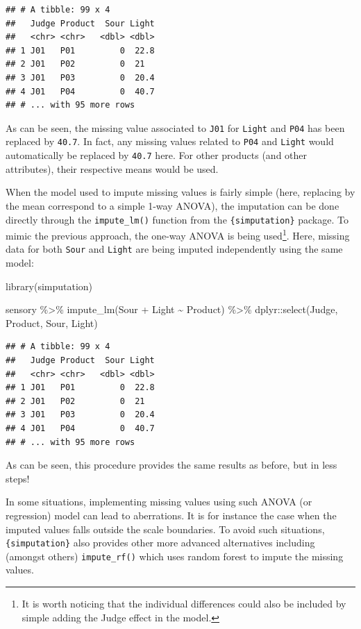 \documentclass[
]{krantz}
\makeatletter
\newenvironment{Shaded}{\begin{snugshade}}{\end{snugshade}}
\newcommand{\FunctionTok}[1]{\textcolor[rgb]{0,0,0}{#1}}
\newcommand{\NormalTok}[1]{#1}
\newcommand{\SpecialCharTok}[1]{\textcolor[rgb]{0,0,0}{#1}}
\newenvironment{kframe}{%
\medskip{}
\setlength{\fboxsep}{.8em}
 \def\at@end@of@kframe{}%
 \ifinner\ifhmode%
  \def\at@end@of@kframe{\end{minipage}}%
  \begin{minipage}{\columnwidth}%
 \fi\fi%
 \def\FrameCommand##1{\hskip\@totalleftmargin \hskip-\fboxsep
 \colorbox{shadecolor}{##1}\hskip-\fboxsep
     \hskip-\linewidth \hskip-\@totalleftmargin \hskip\columnwidth}%
 \MakeFramed {\advance\hsize-\width
   \@totalleftmargin\z@ \linewidth\hsize
   \@setminipage}}%
 {\par\unskip\endMakeFramed%
 \at@end@of@kframe}
\renewenvironment{Shaded}{\begin{kframe}}{\end{kframe}}
\makeatother
\begin{document}
\begin{verbatim}
## # A tibble: 99 x 4
##   Judge Product  Sour Light
##   <chr> <chr>   <dbl> <dbl>
## 1 J01   P01         0  22.8
## 2 J01   P02         0  21  
## 3 J01   P03         0  20.4
## 4 J01   P04         0  40.7
## # ... with 95 more rows
\end{verbatim}

As can be seen, the missing value associated to \texttt{J01} for \texttt{Light} and \texttt{P04} has been replaced by \texttt{40.7}. In fact, any missing values related to \texttt{P04} and \texttt{Light} would automatically be replaced by \texttt{40.7} here. For other products (and other attributes), their respective means would be used.

When the model used to impute missing values is fairly simple (here, replacing by the mean correspond to a simple 1-way ANOVA), the imputation can be done directly through the \texttt{impute\_lm()} function from the \texttt{\{simputation\}} package. To mimic the previous approach, the one-way ANOVA is being used\footnote{It is worth noticing that the individual differences could also be included by simple adding the Judge effect in the model.}. Here, missing data for both \texttt{Sour} and \texttt{Light} are being imputed independently using the same model:

\begin{Shaded}
\begin{Highlighting}[]
\FunctionTok{library}\NormalTok{(simputation)}

\NormalTok{sensory }\SpecialCharTok{\%\textgreater{}\%} 
  \FunctionTok{impute\_lm}\NormalTok{(Sour }\SpecialCharTok{+}\NormalTok{ Light }\SpecialCharTok{\textasciitilde{}}\NormalTok{ Product) }\SpecialCharTok{\%\textgreater{}\%} 
\NormalTok{  dplyr}\SpecialCharTok{::}\FunctionTok{select}\NormalTok{(Judge, Product, Sour, Light)}
\end{Highlighting}
\end{Shaded}

\begin{verbatim}
## # A tibble: 99 x 4
##   Judge Product  Sour Light
##   <chr> <chr>   <dbl> <dbl>
## 1 J01   P01         0  22.8
## 2 J01   P02         0  21  
## 3 J01   P03         0  20.4
## 4 J01   P04         0  40.7
## # ... with 95 more rows
\end{verbatim}

As can be seen, this procedure provides the same results as before, but in less steps!

In some situations, implementing missing values using such ANOVA (or regression) model can lead to aberrations. It is for instance the case when the imputed values falls outside the scale boundaries. To avoid such situations, \texttt{\{simputation\}} also provides other more advanced alternatives including (amongst others) \texttt{impute\_rf()} which uses random forest to impute the missing values.
\end{document}
